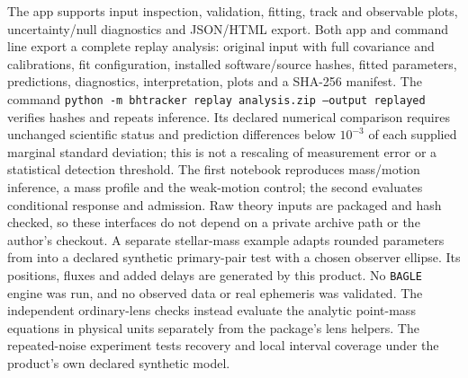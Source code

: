 The app supports input inspection, validation, fitting, track and
observable plots, uncertainty/null diagnostics and JSON/HTML export.
Both app and command line export a complete replay analysis: original
input with full covariance and calibrations, fit configuration, installed
software/source hashes, fitted parameters, predictions, diagnostics,
interpretation, plots and a SHA-256 manifest. The command
\texttt{python -m bhtracker replay analysis.zip --output replayed}
verifies hashes and repeats inference. Its declared numerical comparison
requires unchanged scientific status and prediction differences below
$10^{-3}$ of each supplied marginal standard deviation; this is not a
rescaling of measurement error or a statistical detection threshold.
The first notebook reproduces
mass/motion inference, a mass profile and the weak-motion control; the
second evaluates conditional response and admission. Raw theory inputs
are packaged and hash checked, so these interfaces do not depend on a
private archive path or the author's checkout. A separate stellar-mass
example adapts rounded parameters from \citet{Lu2025} into a declared
synthetic primary-pair test with a chosen observer ellipse. Its positions,
fluxes and added delays are generated by this product. No \texttt{BAGLE}
engine was run, and no observed data or real ephemeris was validated.
The independent ordinary-lens checks instead evaluate the analytic
point-mass equations in physical units separately from the package's
lens helpers. The repeated-noise experiment tests recovery and local
interval coverage under the product's own declared synthetic model.
